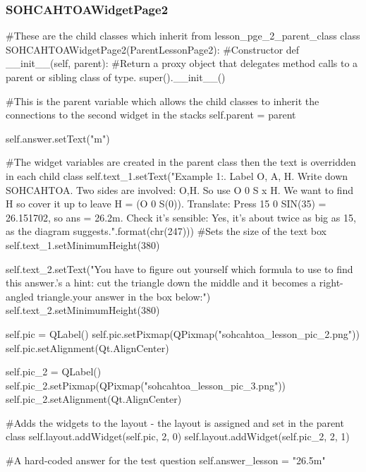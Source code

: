 \begin{landscape}
\subsubsection{SOHCAHTOAWidgetPage2}

\begin{python}
#These are the child classes which inherit from lesson_pge_2_parent_class
class SOHCAHTOAWidgetPage2(ParentLessonPage2):
    #Constructor
    def __init__(self, parent):
        #Return a proxy object that delegates method calls to a parent or sibling class of type.
        super().__init__()
        
        #This is the parent variable which allows the child classes to inherit the connections to the second widget in the stacks       
        self.parent = parent

        self.answer.setText("m")

        #The widget variables are created in the parent class then the text is overridden in each child class
        self.text_1.setText("Example 1:. Label O, A, H. Write down SOHCAHTOA. Two sides are involved: O,H. So use O {0} S x H. We want to find H so cover it up to leave H = (O {0} S(0)). Translate: Press 15 {0} SIN(35) = 26.151702, so ans = 26.2m. Check it's sensible: Yes, it's about twice as big as 15, as the diagram suggests.".format(chr(247)))
        #Sets the size of the text box
        self.text_1.setMinimumHeight(380)
        
        self.text_2.setText("You have to figure out yourself which formula to use to find this answer.\nHere's a hint: cut the triangle down the middle and it becomes a right-angled triangle.\n \n \n \n \n \n \nPut your answer in the box below:")      
        self.text_2.setMinimumHeight(380)

        self.pic = QLabel()
        self.pic.setPixmap(QPixmap("sohcahtoa_lesson_pic_2.png"))
        self.pic.setAlignment(Qt.AlignCenter)

        self.pic_2 = QLabel()
        self.pic_2.setPixmap(QPixmap("sohcahtoa_lesson_pic_3.png"))
        self.pic_2.setAlignment(Qt.AlignCenter)

        #Adds the widgets to the layout - the layout is assigned and set in the parent class
        self.layout.addWidget(self.pic, 2, 0)
        self.layout.addWidget(self.pic_2, 2, 1)

        #A hard-coded answer for the test question
        self.answer_lesson = "26.5m"
\end{python}


\end{landscape}
